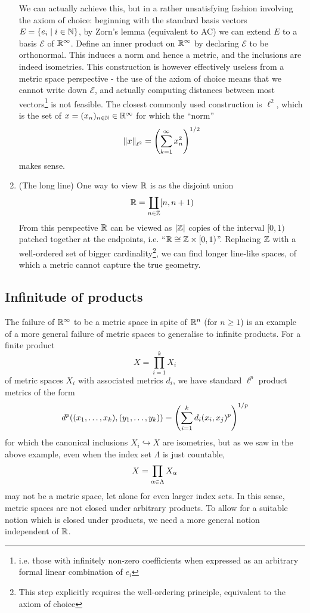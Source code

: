 \documentclass[11pt]{article}
\begin{document}
\begin{example}
\begin{enumerate}
        We can actually achieve this, but in a rather unsatisfying fashion involving the axiom of choice: beginning with the standard basis vectors $E = \left\{  e_i \mid i \in \mathbb{N}  \right\}$, by Zorn's lemma (equivalent to AC) we can extend $E$ to a basis $\mathcal{E}$ of $\mathbb{R}^\infty$. Define an inner product on $\mathbb{R}^\infty$ by declaring $\mathcal{E}$ to be orthonormal. This induces a norm and hence a metric, and the inclusions are indeed isometries. This construction is however effectively useless from a metric space perspective - the use of the axiom of choice means that we cannot write down $\mathcal{E}$, and actually computing distances between most vectors\footnote{i.e. those with infinitely non-zero coefficients when expressed as an arbitrary formal linear combination of $e_i$} is not feasible. The closest commonly used construction is $\ell^2$, which is the set of $x = (x_n)_{n \in \mathbb{N}} \in \mathbb{R}^\infty$ for which the ``norm''
        $$
            \left\| x \right\|_{\ell^2} = \left(  \sum_{k = 1}^\infty x_n^2  \right)^{1/2}
        $$
        makes sense.
        \item (The long line) One way to view $\mathbb{R}$ is as the disjoint union
        $$
            \mathbb{R} = \coprod_{n \in \mathbb{Z}}[n, n + 1)
        $$
        From this perspective $\mathbb{R}$ can be viewed as $\left| \mathbb{Z} \right|$ copies of the interval $[0, 1)$ patched together at the endpoints, i.e. ``$\mathbb{R} \cong \mathbb{Z} \times [0, 1)$''. Replacing $\mathbb{Z}$ with a well-ordered set of bigger cardinality\footnote{This step explicitly requires the well-ordering principle, equivalent to the axiom of choice}, we can find longer line-like spaces, of which a metric cannot capture the true geometry.
    \end{enumerate}
\end{example}
\subsection{Infinitude of products}
The failure of $\mathbb{R}^\infty$ to be a metric space in spite of $\mathbb{R}^n$ (for $n \geq 1$) is an example of a more general failure of metric spaces to generalise to infinite products. For a finite product 
$$
    X = \prod_{i = 1}^k X_i
$$
of metric spaces $X_i$ with associated metrics $d_i$, we have standard $\ell^p$ product metrics of the form
$$
    d^p((x_1, \ldots, x_k), (y_1, \ldots, y_k)) = \left(  \sum_{i = 1}^kd_i(x_i, x_j)^p  \right)^{1/p}
$$
for which the canonical inclusions $X_i \hookrightarrow X$ are isometries, but as we saw in the above example, even when the index set $\Lambda$ is just countable, $$
    X = \prod_{\alpha \in \Lambda} X_\alpha
$$
may not be a metric space, let alone for even larger index sets. In this sense, metric spaces are not closed under arbitrary products. To allow for a suitable notion which is closed under products, we need a more general notion independent of $\mathbb{R}$.
\end{document}
